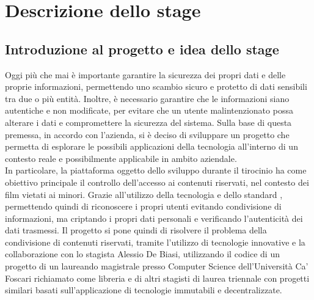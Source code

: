 \chapter{Descrizione dello stage}\label{cap:descrizione-stage}


\section{Introduzione al progetto e idea dello stage}\label{sec:introduzione-progetto}

Oggi più che mai è importante garantire la sicurezza dei propri dati e delle proprie informazioni, permettendo uno scambio sicuro
e protetto di dati sensibili tra due o più entità. Inoltre, è necessario garantire che le informazioni siano autentiche e non modificate,
per evitare che un utente malintenzionato possa alterare i dati e compromettere la sicurezza del sistema.
Sulla base di questa premessa, in accordo con l'azienda, si è deciso di sviluppare un progetto che permetta di esplorare 
le possibili applicazioni della tecnologia  all'interno di un contesto reale e possibilmente applicabile in ambito aziendale. \\

In particolare, la piattaforma oggetto dello sviluppo durante il tirocinio ha come obiettivo principale il controllo dell'accesso ai contenuti
riservati, nel contesto dei film vietati ai minori. Grazie all'utilizzo della tecnologia  e dello standard  ,
permettendo quindi di riconoscere i propri utenti evitando condivisione di informazioni, ma criptando i propri dati personali e verificando l'autenticità
dei dati trasmessi. Il progetto si pone quindi di risolvere il problema della condivisione di contenuti riservati, tramite l'utilizzo di tecnologie innovative
e la collaborazione con lo stagista Alessio De Biasi, utilizzando il codice di un progetto di un laureando magistrale presso Computer Science
dell'Università Ca' Foscari richiamato come libreria e di altri stagisti di laurea triennale con progetti similari basati sull'applicazione di tecnologie immutabili e decentralizzate. \\

